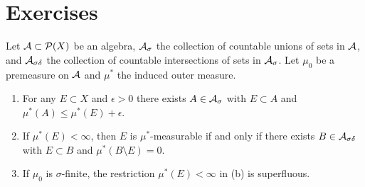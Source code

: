 \section*{\centering Exercises}
\begin{exercise}
Let $\mathcal{A} \subset \mathcal{P}(X)$ be an algebra, $\mathcal{A}_\sigma$ the collection of countable unions of sets in $\mathcal{A}$, and $\mathcal{A}_{\sigma\delta}$ the collection of countable intersections of sets in $\mathcal{A}_\sigma$. Let $\mu_0$ be a premeasure on $\mathcal{A}$ and $\mu^\ast$ the induced outer measure.
    \begin{enumerate}[label = (\alph*),itemsep=1pt,topsep=3pt]
        \item For any $E \subset X$ and $\epsilon > 0$ there exists $A \in \mathcal{A}_\sigma$ with $E \subset A$ and $\mu^\ast(A) \leq \mu^\ast(E) + \epsilon$.
        \item If $\mu^\ast(E) < \infty$, then $E$ is $\mu^\ast$-measurable if and only if there exists $B \in \mathcal{A}_{\sigma\delta}$ with $E \subset B$ and $\mu^\ast(B \setminus E) = 0$.
        \item If $\mu_0$ is $\sigma$-finite, the restriction $\mu^\ast(E) < \infty$ in (b) is superfluous.
    \end{enumerate}
\end{exercise}
